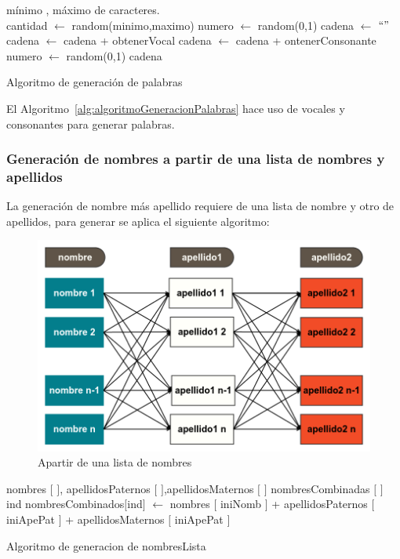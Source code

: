 \begin{algorithm}[H]
\begin{algorithmic}[1]
\REQUIRE m\'inimo , m\'aximo de caracteres.\\
\STATE cantidad $\leftarrow$ random(minimo,maximo)
\STATE numero $\leftarrow$ random(0,1)
\STATE cadena $\leftarrow$ $`` "$
\STATE cadena $\leftarrow$ cadena + obtenerVocal
\ELSE
\STATE cadena $\leftarrow$ cadena + ontenerConsonante
\ENDIF
\STATE numero $\leftarrow$ random(0,1)
\ENDWHILE
\RETURN cadena
\end{algorithmic}
\caption{Algoritmo de generaci\'on de palabras}\label{alg:algoritmoGeneracionPalabras}
\end{algorithm}
El Algoritmo~\ref{alg:algoritmoGeneracionPalabras} hace uso de vocales y consonantes para generar palabras.

\subsubsection{Generaci\'on de nombres a partir de una lista de nombres y apellidos}
La generaci\'on de nombre m\'as apellido requiere de una lista de nombre y otro de apellidos, para generar se aplica el siguiente algoritmo:
\begin{figure}[H]
\centering
\includegraphics[scale=0.4]{images/listNameApe1Ape2.png}
\caption{Apartir de una lista de nombres}
\end{figure}
\begin{algorithm}[H]
\begin{algorithmic}[1]
\REQUIRE nombres $[$ $]$, apellidosPaternos $[$ $]$,apellidosMaternos $[$ $]$ \label{lin:NombresApellido1Apellido2}
\STATE nombresCombinadas $[$ $]$
\STATE ind
\STATE nombresCombinados$[$ind$]$ $\leftarrow$ nombres $[$ iniNomb $]$ + apellidosPaternos $[$ iniApePat $]$ + apellidosMaternos $[$ iniApePat $]$
\ENDFOR
\ENDFOR 
\ENDFOR
\RETURN \TRUE
\end{algorithmic}
\caption{Algoritmo de generacion de nombresLista}\label{alg:algoritmoRaro}
\end{algorithm}
